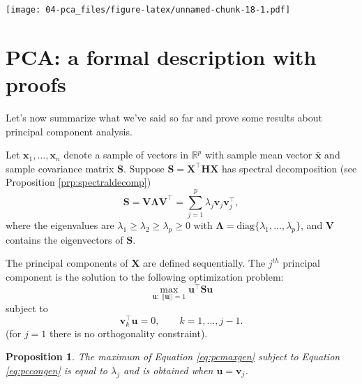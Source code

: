 \documentclass[]{book}
\newtheorem{proposition}{Proposition}[chapter]
\theoremstyle{definition}
\theoremstyle{definition}
\theoremstyle{definition}
\theoremstyle{remark}
\begin{document}
\texttt{[image: 04-pca\_files/figure-latex/unnamed-chunk-18-1.pdf]}

\hypertarget{pca-a-formal-description-with-proofs}{%
\section{PCA: a formal description with proofs}\label{pca-a-formal-description-with-proofs}}

Let's now summarize what we've said so far and prove some results about principal component analysis.

Let \(\boldsymbol x_1, \ldots , \boldsymbol x_n\) denote a sample of vectors in \(\mathbb{R}^p\) with sample mean vector \(\bar{\boldsymbol x}\) and sample covariance matrix \(\boldsymbol S\). Suppose \(\boldsymbol S=\boldsymbol X^\top \boldsymbol H\boldsymbol X\) has spectral decomposition (see Proposition \ref{prp:spectraldecomp})
\begin{equation}
\boldsymbol S=\boldsymbol V\boldsymbol \Lambda\boldsymbol V^\top = \sum_{j=1}^p  \lambda_j \boldsymbol v_j \boldsymbol v_j^\top,
\label{eq:pcaspect}
\end{equation}
where the eigenvalues are \(\lambda_1 \geq \lambda_2 \geq \lambda_p \geq 0\) with \(\boldsymbol \Lambda=\text{diag}\{\lambda_1, \ldots, \lambda_p\}\), and \(\boldsymbol V\) contains the eigenvectors of \(\boldsymbol S\).

The principal components of \(\boldsymbol X\) are defined sequentially. The \(j^{th}\) principal component is the solution to the following optimization problem:
\begin{equation}
\max_{\boldsymbol u: \, \vert \vert \boldsymbol u\vert \vert =1}\boldsymbol u^\top \boldsymbol S\boldsymbol u
\label{eq:pcmaxgen}
\end{equation}
subject to
\begin{equation}
\boldsymbol v_k^\top \boldsymbol u=0, \qquad k=1, \ldots , j-1.
\label{eq:pccongen}
\end{equation}
(for \(j=1\) there is no orthogonality constraint).

\begin{proposition}
\protect\hypertarget{prp:pca1}{}{\label{prp:pca1} }The maximum of Equation \eqref{eq:pcmaxgen}
subject to Equation \eqref{eq:pccongen} is equal to \(\lambda_j\) and is obtained when \(\boldsymbol u=\boldsymbol v_j\).
\end{proposition}
\end{document}
